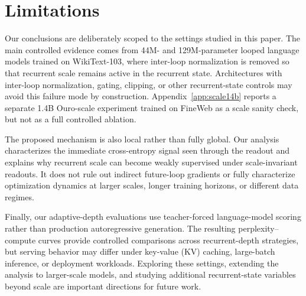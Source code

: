 \section{Limitations}
\label{sec:limitations}

Our conclusions are deliberately scoped to the settings studied in this paper. The main controlled evidence comes from 44M- and 129M-parameter looped language models trained on WikiText-103, where inter-loop normalization is removed so that recurrent scale remains active in the recurrent state. Architectures with inter-loop normalization, gating, clipping, or other recurrent-state controls may avoid this failure mode by construction. Appendix~\ref{app:scale14b} reports a separate 1.4B Ouro-scale experiment trained on FineWeb as a scale sanity check, but not as a full controlled ablation.

The proposed mechanism is also local rather than fully global. Our analysis characterizes the immediate cross-entropy signal seen through the readout and explains why recurrent scale can become weakly supervised under scale-invariant readouts. It does not rule out indirect future-loop gradients or fully characterize optimization dynamics at larger scales, longer training horizons, or different data regimes.

Finally, our adaptive-depth evaluations use teacher-forced language-model scoring rather than production autoregressive generation. The resulting perplexity--compute curves provide controlled comparisons across recurrent-depth strategies, but serving behavior may differ under key-value (KV) caching, large-batch inference, or deployment workloads. Exploring these settings, extending the analysis to larger-scale models, and studying additional recurrent-state variables beyond scale are important directions for future work.
